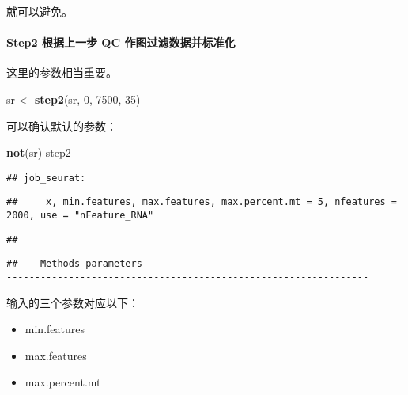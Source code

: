 \documentclass[
]{article}
\newenvironment{Shaded}{\begin{snugshade}}{\end{snugshade}}
\newcommand{\DecValTok}[1]{\textcolor[rgb]{0.00,0.00,0.81}{#1}}
\newcommand{\KeywordTok}[1]{\textcolor[rgb]{0.13,0.29,0.53}{\textbf{#1}}}
\newcommand{\NormalTok}[1]{#1}
\newcommand{\StringTok}[1]{\textcolor[rgb]{0.31,0.60,0.02}{#1}}
\providecommand{\tightlist}{%
  \setlength{\itemsep}{0pt}\setlength{\parskip}{0pt}}
\begin{document}
就可以避免。

\hypertarget{step2-ux6839ux636eux4e0aux4e00ux6b65-qc-ux4f5cux56feux8fc7ux6ee4ux6570ux636eux5e76ux6807ux51c6ux5316}{%
\paragraph{Step2 根据上一步 QC 作图过滤数据并标准化}\label{step2-ux6839ux636eux4e0aux4e00ux6b65-qc-ux4f5cux56feux8fc7ux6ee4ux6570ux636eux5e76ux6807ux51c6ux5316}}

这里的参数相当重要。

\begin{Shaded}
\begin{Highlighting}[]
\NormalTok{sr \textless{}{-}}\StringTok{ }\KeywordTok{step2}\NormalTok{(sr, }\DecValTok{0}\NormalTok{, }\DecValTok{7500}\NormalTok{, }\DecValTok{35}\NormalTok{)}
\end{Highlighting}
\end{Shaded}

可以确认默认的参数：

\begin{Shaded}
\begin{Highlighting}[]
\KeywordTok{not}\NormalTok{(sr)}
\NormalTok{step2}
\end{Highlighting}
\end{Shaded}

\begin{verbatim}
## job_seurat:
\end{verbatim}

\begin{verbatim}
##     x, min.features, max.features, max.percent.mt = 5, nfeatures = 2000, use = "nFeature_RNA"
\end{verbatim}

\begin{verbatim}
## 
\end{verbatim}

\begin{verbatim}
## -- Methods parameters -------------------------------------------------------------------------------------------------------------
\end{verbatim}

输入的三个参数对应以下：

\begin{itemize}
\tightlist
\item
  min.features
\item
  max.features
\item
  max.percent.mt
\end{itemize}
\end{document}
